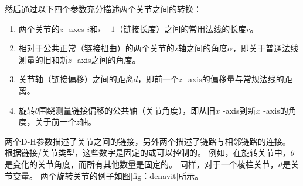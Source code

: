 
然后通过以下四个参数充分描述两个关节之间的转换：


\begin{enumerate}
\item 两个关节的$ z $ -axes $ i $和$ i-1 $（链接长度）之间的常用法线的长度$ r $。
\item 相对于公共正常（链接扭曲）的两个关节的z轴之间的角度$ \alpha $，即关于普通法线测量的旧和新$ z $ -axis之间的角度。
\item 关节轴（链接偏移）之间的距离$ d $，即前一个$ z $ -axis的偏移量与常规法线的距离。
\item 旋转$ \theta $围绕测量链接偏移的公共轴（关节角度），即从旧$ x $ -axis到新$ x $ -axis的角度，关于前一个$ z$轴。
\end{enumerate}


两个D-H参数描述了关节之间的链接，另外两个描述了链路与相邻链路的连接。 根据链接/关节类型，这些数字是固定的或可以控制的。 例如，在旋转关节中，$ \theta$是变化的关节角度，而所有其他数量是固定的。 同样，对于一个棱柱关节，$ d $是关节变量。 两个旋转关节的例子如图\ref {fig：denavit}所示。

